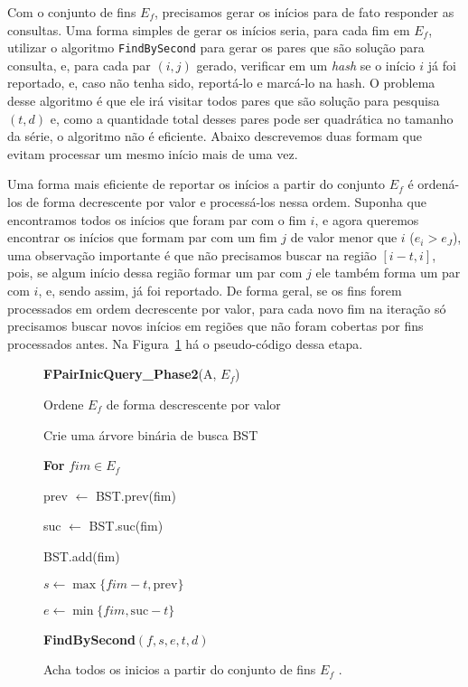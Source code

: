 \documentclass[12pt]{article}
\begin{document}
Com o conjunto de fins $E_f$, precisamos gerar os inícios para de fato responder as consultas.
Uma forma simples de gerar os inícios seria, para cada fim em $E_f$, utilizar o algoritmo \verb|FindBySecond| para 
gerar os pares que são solução para consulta, e, para cada par $(i, j)$ gerado,
verificar em um \textit{hash} se o início $i$ já foi reportado, e, caso não tenha sido, 
reportá-lo e marcá-lo na hash. O problema desse algoritmo é que ele irá visitar todos
pares que são solução para pesquisa $(t, d)$ e, como a quantidade total desses pares 
pode ser quadrática no tamanho da série, o algoritmo não é eficiente. Abaixo
descrevemos duas formam que evitam processar um mesmo início mais de uma vez.

Uma forma mais eficiente de reportar os inícios a partir do conjunto $E_f$ é 
ordená-los de forma decrescente por valor e processá-los nessa ordem. Suponha que encontramos
todos os inícios que foram par com o fim $i$, e agora queremos encontrar
os inícios que formam par com um fim $j$ de valor menor que $i$ ($e_i > e_J$),
uma observação importante é que não precisamos buscar na região $[i - t, i]$, pois,
se algum início dessa região formar um par com $j$ ele também forma um par com $i$, e,
sendo assim, já foi reportado. De forma geral, se os fins forem processados em 
ordem decrescente por valor, para cada novo fim na iteração só precisamos buscar novos
inícios em regiões que não foram cobertas por fins processados antes. Na Figura~\ref{fpairinicqueryphase2}
há o pseudo-código dessa etapa. 

\begin{figure}
\begin{framed}
{\bf FPairInicQuery\_Phase2}(A, $E_f$)

\hspace{1cm} Ordene $E_f$ de forma descrescente por valor

\hspace{1cm} Crie uma árvore binária de busca BST

\hspace{1cm} \textbf{For} $fim \in E_f$

\hspace{2cm} prev $\leftarrow $ BST.prev(fim)

\hspace{2cm} suc $\leftarrow $ BST.suc(fim)

\hspace{2cm} BST.add(fim)

\hspace{2cm} $s \leftarrow \max\{fim - t, \text{prev}\}$ 

\hspace{2cm} $e \leftarrow \min\{fim, \text{suc} - t \}$ 

\hspace{2cm} {\bf FindBySecond}$(f, s, e, t, d)$

\end{framed}
\caption{Acha todos os inicios a partir do conjunto de fins $E_f$ .}
\label{fpairinicqueryphase2}
\end{figure}
\end{document}
